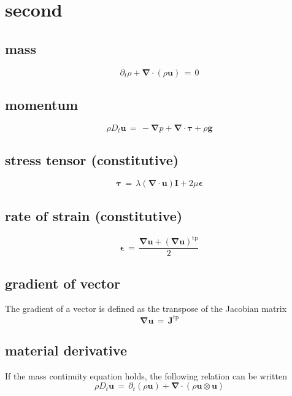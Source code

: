 \documentclass[11pt,a4paper]{report}
\begin{document}
\section{second}
\subsection{mass}
\begin{equation}
\partial_{t}\rho+\boldsymbol{\nabla}\cdot(\rho\boldsymbol{u})\,=\,0
\end{equation}

\subsection{momentum}

\begin{equation}
\rho D_{t}\boldsymbol{u}\,=\,-\boldsymbol{\nabla}p+\boldsymbol{\nabla}\cdot\boldsymbol{\tau}+\rho\boldsymbol{g}
\end{equation}

\subsection{stress tensor (constitutive)}
\begin{equation}
\boldsymbol{\tau}\,=\,\lambda(\boldsymbol{\nabla}\cdot\boldsymbol{u})\boldsymbol{I}+2\mu\boldsymbol{\epsilon}
\end{equation}

\subsection{rate of strain (constitutive)}

\begin{equation}
\boldsymbol{\epsilon}\,=\,\frac{\boldsymbol{\nabla}\boldsymbol{u}+(\boldsymbol{\nabla}\boldsymbol{u})^{\mathrm{tp}}}{2}
\end{equation}

\subsection{gradient of vector}
The gradient of a vector is defined as the transpose of the Jacobian matrix
\begin{equation}
\boldsymbol{\nabla}\boldsymbol{u}\,=\,\boldsymbol{J}^{\mathrm{tp}}
\end{equation}
	
\subsection{material derivative}
If the mass continuity equation holds, the following relation can be written
\begin{equation}
\rho D_{t}\boldsymbol{u}\,=\,\partial_{t}(\rho\boldsymbol{u})+\boldsymbol{\nabla}\cdot\left(\rho\boldsymbol{u}\otimes\boldsymbol{u}\right)
\end{equation}
\end{document}
